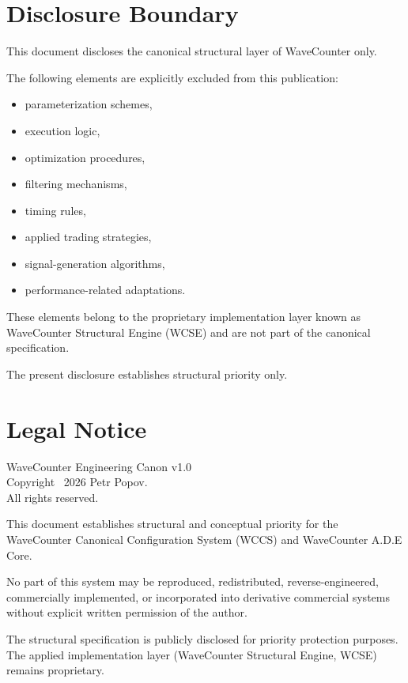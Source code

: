 \documentclass[11pt]{article}
\begin{document}
\section{Disclosure Boundary}
This document discloses the canonical structural layer of WaveCounter only.

The following elements are explicitly excluded from this publication:

\begin{itemize}
\item parameterization schemes,
\item execution logic,
\item optimization procedures,
\item filtering mechanisms,
\item timing rules,
\item applied trading strategies,
\item signal-generation algorithms,
\item performance-related adaptations.
\end{itemize}

These elements belong to the proprietary implementation layer known as
WaveCounter Structural Engine (WCSE) and are not part of the canonical specification.

The present disclosure establishes structural priority only.
\section{Legal Notice}

WaveCounter Engineering Canon v1.0 \\
Copyright \textcopyright\ 2026 Petr Popov. \\
All rights reserved.

This document establishes structural and conceptual priority for the
WaveCounter Canonical Configuration System (WCCS) and WaveCounter A.D.E Core.

No part of this system may be reproduced, redistributed, reverse-engineered,
commercially implemented, or incorporated into derivative commercial systems
without explicit written permission of the author.

The structural specification is publicly disclosed for priority protection purposes.
The applied implementation layer (WaveCounter Structural Engine, WCSE) remains proprietary.
\end{document}
